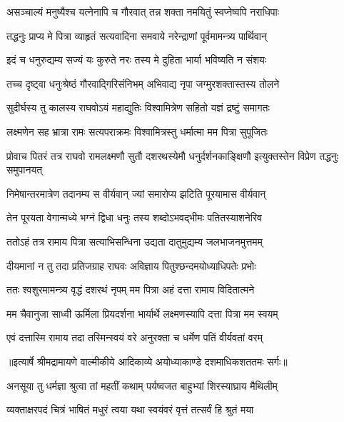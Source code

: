 \twolineshloka
{असञ्चाल्यं मनुष्यैश्च यत्नेनापि च गौरवात्}
{तन्न शक्ता नमयितुं स्वप्नेष्वपि नराधिपाः} %

\twolineshloka
{तद्धनुः प्राप्य मे पित्रा व्याहृतं सत्यवादिना}
{समवाये नरेन्द्राणां पूर्वमामन्त्र्य पार्थिवान्} %

\twolineshloka
{इदं च धनुरुद्यम्य सज्यं यः कुरुते नरः}
{तस्य मे दुहिता भार्या भविष्यति न संशयः} %

\twolineshloka
{तच्च दृष्ट्वा धनुःश्रेष्ठं गौरवाद्गिरिसंनिभम्}
{अभिवाद्य नृपा जग्मुरशक्तास्तस्य तोलने} %

\twolineshloka
{सुदीर्घस्य तु कालस्य राघवोऽयं महाद्युतिः}
{विश्वामित्रेण सहितो यज्ञं द्रष्टुं समागतः} %

\twolineshloka
{लक्ष्मणेन सह भ्रात्रा रामः सत्यपराक्रमः}
{विश्वामित्रस्तु धर्मात्मा मम पित्रा सुपूजितः} %

\threelineshloka
{प्रोवाच पितरं तत्र राघवो रामलक्ष्मणौ}
{सुतौ दशरथस्येमौ धनुर्दर्शनकाङ्क्षिणौ}
{इत्युक्तस्तेन विप्रेण तद्धनुः समुपानयत्} %

\twolineshloka
{निमेषान्तरमात्रेण तदानम्य स वीर्यवान्}
{ज्यां समारोप्य झटिति पूरयामास वीर्यवान्} %

\twolineshloka
{तेन पूरयता वेगान्मध्ये भग्नं द्विधा धनुः}
{तस्य शब्दोऽभवद्भीमः पतितस्याशनेरिव} %

\twolineshloka
{ततोऽहं तत्र रामाय पित्रा सत्याभिसन्धिना}
{उद्यता दातुमुद्यम्य जलभाजनमुत्तमम्} %

\twolineshloka
{दीयमानां न तु तदा प्रतिजग्राह राघवः}
{अविज्ञाय पितुश्छन्दमयोध्याधिपतेः प्रभोः} %

\twolineshloka
{ततः श्वशुरमामन्त्र्य वृद्धं दशरथं नृपम्}
{मम पित्रा अहं दत्ता रामाय विदितात्मने} %

\twolineshloka
{मम चैवानुजा साध्वी ऊर्मिला प्रियदर्शना}
{भार्यार्थे लक्ष्मणस्यापि दत्ता पित्रा मम स्वयम्} %

\twolineshloka
{एवं दत्तास्मि रामाय तदा तस्मिन्स्वयं वरे}
{अनुरक्ता च धर्मेण पतिं वीर्यवतां वरम्} %


{॥इत्यार्षे श्रीमद्रामायणे वाल्मीकीये आदिकाव्ये अयोध्याकाण्डे दशमाधिकशततमः सर्गः॥}


\twolineshloka
{अनसूया तु धर्मज्ञा श्रुत्वा तां महतीं कथाम्}
{पर्यष्वजत बाहुभ्यां शिरस्याघ्राय मैथिलीम्} %

\twolineshloka
{व्यक्ताक्षरपदं चित्रं भाषितं मधुरं त्वया}
{यथा स्वयंवरं वृत्तं तत्सर्वं हि श्रुतं मया} %

